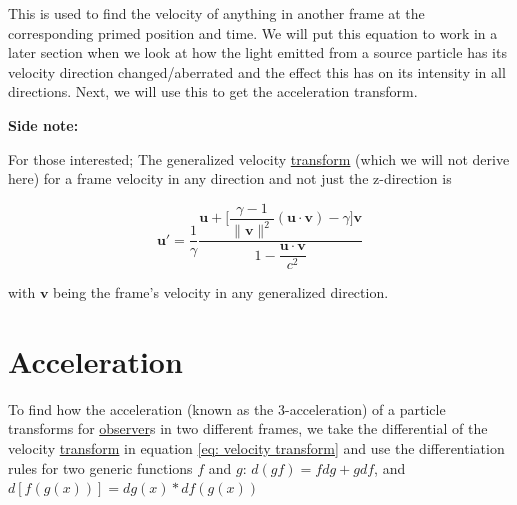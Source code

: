 This is used to find the velocity of anything in another frame at the corresponding primed position and time.
We will put this equation to work in a later section when we look at how the light emitted from a source particle has its velocity direction changed/aberrated and the effect this has on its intensity in all directions. Next, we will use this to get the acceleration transform.

\textbf{Side note:}

For those interested; The generalized velocity \hyperlink{def-transform}{transform} (which we will not derive here) for a frame velocity in any direction and not just the z-direction is

\begin{equation}
	\mathbf{u}{'} = \dfrac{1}{{\gamma}} \dfrac{\mathbf{u} + \Big[\dfrac{{\gamma}-1}{\|\mathbf{v}\|^2}(\mathbf{u}\cdot \mathbf{v})-{\gamma} \Big] \mathbf{v}}{1-\dfrac{\mathbf{u}\cdot\mathbf{v}}{{c}^2}}
\end{equation}

with ${\mathbf{v}}$ being the frame's velocity in any generalized direction.



\section{Acceleration} \label{sect: Acceleration}

To find how the acceleration (known as the 3-acceleration) of a particle transforms for \hyperlink{def-observer}{observer}s in two different frames, we take the differential of the velocity \hyperlink{def-transform}{transform} in equation \eqref{eq: velocity transform} and use the differentiation rules for two generic functions ${f}$ and ${g}$: ${d(gf)} = {f} {dg} + {g} {df}$, and ${d[{{f}({g}(x))}]} = {{dg}(x)} * {df({{g}(x)})}$

